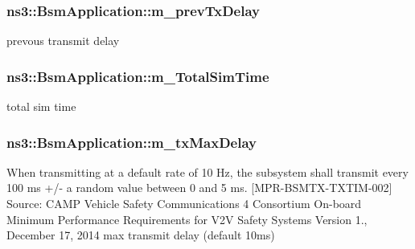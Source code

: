 \subsubsection[{\texorpdfstring{m\+\_\+prev\+Tx\+Delay}{m_prevTxDelay}}]{ ns3\+::\+Bsm\+Application\+::m\+\_\+prev\+Tx\+Delay\hspace{0.3cm}{\ttfamily [private]}}\hypertarget{classns3_1_1BsmApplication_a9fcac2779174fb7abfb6bcadf8c66f83}{}\label{classns3_1_1BsmApplication_a9fcac2779174fb7abfb6bcadf8c66f83}


prevous transmit delay 

\subsubsection[{\texorpdfstring{m\+\_\+\+Total\+Sim\+Time}{m_TotalSimTime}}]{ ns3\+::\+Bsm\+Application\+::m\+\_\+\+Total\+Sim\+Time\hspace{0.3cm}{\ttfamily [private]}}\hypertarget{classns3_1_1BsmApplication_a0f53d0889462a50b4982657ca6db083d}{}\label{classns3_1_1BsmApplication_a0f53d0889462a50b4982657ca6db083d}


total sim time 

\subsubsection[{\texorpdfstring{m\+\_\+tx\+Max\+Delay}{m_txMaxDelay}}]{ ns3\+::\+Bsm\+Application\+::m\+\_\+tx\+Max\+Delay\hspace{0.3cm}{\ttfamily [private]}}\hypertarget{classns3_1_1BsmApplication_a30f0fb812b58a1bf98ec17129283dcb8}{}\label{classns3_1_1BsmApplication_a30f0fb812b58a1bf98ec17129283dcb8}
When transmitting at a default rate of 10 Hz, the subsystem shall transmit every 100 ms +/-\/ a random value between 0 and 5 ms. \mbox{[}M\+P\+R-\/\+B\+S\+M\+T\+X-\/\+T\+X\+T\+I\+M-\/002\mbox{]} Source\+: C\+A\+MP Vehicle Safety Communications 4 Consortium On-\/board Minimum Performance Requirements for V2V Safety Systems Version 1., December 17, 2014 max transmit delay (default 10ms) 
